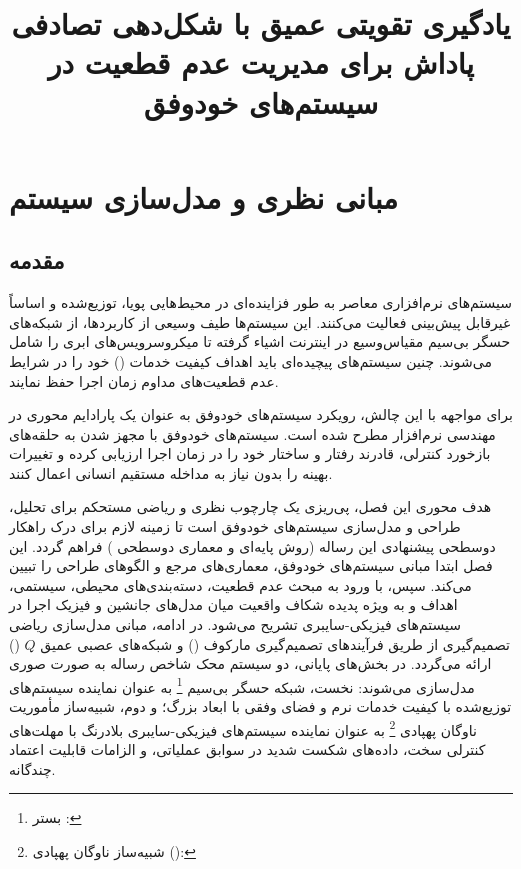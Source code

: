 \documentclass[oneside,openany,phd]{TMU-Thesis}
\title{یادگیری تقویتی عمیق با شکل‌دهی تصادفی پاداش برای مدیریت عدم قطعیت در سیستم‌های خودوفق}
\begin{document}
\AutoPersianDigits
{}

\setcounter{chapter}{1}

\chapter{مبانی نظری و مدل‌سازی سیستم}
\label{ch:theory_and_modeling}

\section{مقدمه}

سیستم‌های نرم‌افزاری معاصر به طور فزاینده‌ای در محیط‌هایی پویا، توزیع‌شده و اساساً غیرقابل پیش‌بینی فعالیت می‌کنند. این سیستم‌ها طیف وسیعی از کاربردها، از شبکه‌های حسگر بی‌سیم مقیاس‌وسیع در اینترنت اشیاء گرفته تا میکروسرویس‌های ابری را شامل می‌شوند. چنین سیستم‌های پیچیده‌ای باید اهداف کیفیت خدمات () خود را در شرایط عدم قطعیت‌های مداوم زمان اجرا حفظ نمایند.

برای مواجهه با این چالش، رویکرد سیستم‌های خودوفق به عنوان یک پارادایم محوری در مهندسی نرم‌افزار مطرح شده است. سیستم‌های خودوفق با مجهز شدن به حلقه‌های بازخورد کنترلی، قادرند رفتار و ساختار خود را در زمان اجرا ارزیابی کرده و تغییرات بهینه را بدون نیاز به مداخله مستقیم انسانی اعمال کنند.

هدف محوری این فصل، پی‌ریزی یک چارچوب نظری و ریاضی مستحکم برای تحلیل، طراحی و مدل‌سازی سیستم‌های خودوفق است تا زمینه لازم برای درک راهکار دوسطحی پیشنهادی این رساله (روش پایه‌ای  و معماری دوسطحی \rsdrlplus) فراهم گردد. این فصل ابتدا مبانی سیستم‌های خودوفق، معماری‌های مرجع و الگوهای طراحی را تبیین می‌کند. سپس، با ورود به مبحث عدم قطعیت، دسته‌بندی‌های محیطی، سیستمی، اهداف و به ویژه پدیده شکاف واقعیت میان مدل‌های جانشین و فیزیک اجرا در سیستم‌های فیزیکی-سایبری تشریح می‌شود. در ادامه، مبانی مدل‌سازی ریاضی تصمیم‌گیری از طریق فرآیندهای تصمیم‌گیری مارکوف () و شبکه‌های عصبی عمیق $Q$ () ارائه می‌گردد. در بخش‌های پایانی، دو سیستم محک شاخص رساله به صورت صوری مدل‌سازی می‌شوند: نخست، شبکه حسگر بی‌سیم \footnote{بستر : } به عنوان نماینده سیستم‌های توزیع‌شده با کیفیت خدمات نرم و فضای وفقی با ابعاد بزرگ؛ و دوم، شبیه‌ساز مأموریت ناوگان پهپادی \footnote{شبیه‌ساز ناوگان پهپادی  (): } به عنوان نماینده سیستم‌های فیزیکی-سایبری بلادرنگ با مهلت‌های کنترلی سخت، داده‌های شکست شدید در سوابق عملیاتی، و الزامات قابلیت اعتماد چندگانه.
\end{document}
